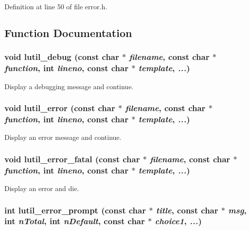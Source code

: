 Definition at line 50 of file error.h.

\subsection{Function Documentation}
\subsubsection{\setlength{\rightskip}{0pt plus 5cm}void lutil\_\-debug (const char $\ast$ {\em filename}, const char $\ast$ {\em function}, int {\em lineno}, const char $\ast$ {\em template},  {\em ...})}\label{error_8h_a10}


Display a debugging message and continue. 

\subsubsection{\setlength{\rightskip}{0pt plus 5cm}void lutil\_\-error (const char $\ast$ {\em filename}, const char $\ast$ {\em function}, int {\em lineno}, const char $\ast$ {\em template},  {\em ...})}\label{error_8h_a9}


Display an error message and continue. 

\subsubsection{\setlength{\rightskip}{0pt plus 5cm}void lutil\_\-error\_\-fatal (const char $\ast$ {\em filename}, const char $\ast$ {\em function}, int {\em lineno}, const char $\ast$ {\em template},  {\em ...})}\label{error_8h_a7}


Display an error and die. 

\subsubsection{\setlength{\rightskip}{0pt plus 5cm}int lutil\_\-error\_\-prompt (const char $\ast$ {\em title}, const char $\ast$ {\em msg}, int {\em n\-Total}, int {\em n\-Default}, const char $\ast$ {\em choice1},  {\em ...})}\label{error_8h_a8}


